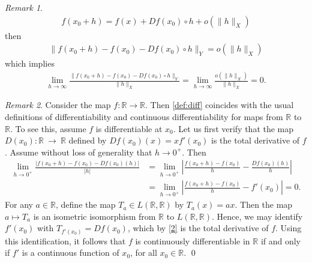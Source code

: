 \documentclass[12pt,reqno]{amsart}
\numberwithin{equation}{section}  %
\numberwithin{figure}{section}
\newcommand{\rr}{\mathbb{R}}
\theoremstyle{plain}
\theoremstyle{definition}
\theoremstyle{remark}
\newtheorem{remark}{Remark}
\begin{document}
\begin{framed}
\begin{remark}
    \begin{equation*}
    \begin{split}
      f(x_{0} + h) = f(x) + Df(x_{0}) \circ h + o(\| h \|_{X})
    \end{split}
    \end{equation*}
    then
    \begin{equation*}
    \begin{split}
      \| f(x_{0} + h) - f(x_{0}) - Df(x_{0}) \circ h \|_{Y} = o(\| h
      \|_{X})
    \end{split}
    \end{equation*}
    which implies
    \begin{equation*}
    \begin{split}
      \lim_{h \to \infty} \frac{\| f(x_{0} + h) - f(x_{0}) - Df(x_{0}) \circ h
      \|_{Y}}{\| h \|_{X}}  = \lim_{h \to \infty} \frac{o(\| h \|_{X})}{\| h
      \|_{X}} = 0.
    \end{split}
    \end{equation*}
  \label{rem:equiv-def}
  \end{remark}
  \end{framed}
  \begin{framed}
	\begin{remark}
		\label{rem:usual-diff}
		Consider the map $f: \rr \to \rr$. Then \autoref{def:diff} 
		coincides with the usual definitions of
		differentiability and continuous differentiability for maps
		from $\rr $ to $\rr$.
		To see this, assume $f$ is differentiable at $x_0$.
		Let us first verify that the map  $D(x_0): \rr ~\to~\rr$
		defined by $Df(x_0)(x) =
		xf'(x_0)$ is the total derivative of $f$. Assume without loss of generality
		that $h \to 0^+$. Then
		\begin{equation}
			\label{2}
			\begin{split}
				 \lim_{h \to 0^+} \frac{| f( x_0 + h) - f(x_0) -
				Df(x_0)(h) |}{|h|}
				 & = \lim_{h\to 0^+} \left |\frac{f(x_0+h) -
				f(x_0)}{h} - \frac{Df(x_0)(h)}{h}  \right |
				\\
				 & =\lim_{h \to 0^+} \left |\frac{f(x_0+h) - f(x_0)}{h} -
				f'(x_0) \right | = 0.
			\end{split}
		\end{equation}
%
%
For any $a \in \rr$, define the map $T_{a} \in L(\rr , \rr)$ by
$T_{a}(x) = ax$. Then the map $a \mapsto T_a$ is an isometric
isomorphism from $\rr$ to $L( \rr, \rr)$. Hence, 
we may identify $f'(x_0)$ with $T_{f'(x_0)} = Df(x_0)$,
which by \eqref{2} is the total derivative of $f$.  Using this identification,
it follows that $f$ is continuously
differentiable in $\rr$ if and only if $f'$ is a continuous function of
$x_0$, for all $x_0 \in \rr$. \qed
%
\end{remark}
\end{framed}
\end{document}
